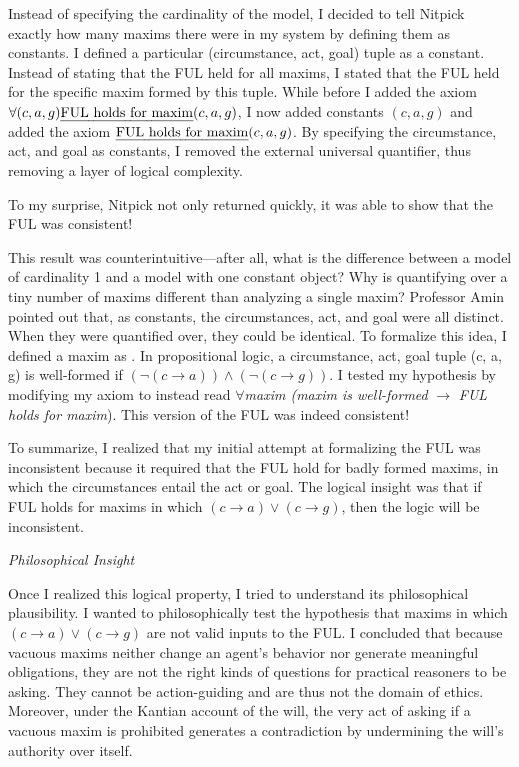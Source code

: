 \begin{isabellebody}
\begin{isamarkuptext}
Instead of specifying the cardinality of the model, I decided to tell Nitpick exactly how many 
maxims there were in my system by defining them as constants. I defined a particular 
(circumstance, act, goal) tuple as a constant. Instead of
stating that the FUL held for all maxims, I stated that the FUL held for the specific maxim formed by this tuple.
While before I added the axiom $\forall (c, a, g) \text{\emph{FUL holds for maxim}} (c, a, g)$, I now added constants $(c, a, g)$ 
and added the axiom $\text{\emph{FUL holds for maxim}} (c, a, g)$. By specifying the circumstance, act, and goal 
as constants, I removed the external universal quantifier, thus removing a layer of logical complexity.

To my surprise, Nitpick not only returned quickly, it was able to show that the FUL was consistent!

This result was counterintuitive—after all, what is the difference between a model of cardinality 
1 and a model with one constant object? Why is quantifying over a tiny number of maxims different
 than analyzing a single maxim? Professor Amin pointed out that, as constants, the 
circumstances, act, and goal were all distinct. When they were quantified over, 
they could be identical. To formalize this idea, I defined a maxim as . In propositional 
logic, a circumstance, act, goal tuple (c, a, g) is well-formed if $(\neg (c \longrightarrow a) ) \wedge 
(\neg(c \longrightarrow g))$. I tested my hypothesis by modifying my axiom to instead read $\forall$\emph{maxim
(maxim is well-formed} $\longrightarrow$ \emph{FUL holds for maxim}). This version of the FUL was indeed consistent!

To summarize, I realized that my initial attempt at formalizing the FUL was inconsistent because 
it required that the FUL hold for badly formed maxims, in which the circumstances entail the act or 
goal. The logical insight was that if FUL holds for maxims in which $(c \longrightarrow a) \vee 
(c \longrightarrow g)$, then the logic will be inconsistent.

\emph{Philosophical Insight}

Once I realized this logical property, I tried to understand its philosophical plausibility. I 
wanted to philosophically test the hypothesis that maxims in which  $(c \longrightarrow a) \vee 
(c \longrightarrow g)$ are not valid inputs to the FUL. I concluded that because vacuous maxims neither 
change an agent's behavior nor generate meaningful obligations, they are not the right kinds of questions 
for practical reasoners to be asking. They cannot be action-guiding and are thus not the domain of ethics.
Moreover, under the Kantian account of the will, the very act of asking if a vacuous maxim is prohibited 
generates a contradiction by undermining the will's authority over itself. 


\end{isamarkuptext}
\end{isabellebody}
